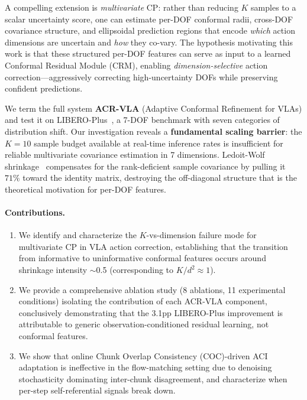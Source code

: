 \documentclass[letterpaper]{article}
\begin{document}
A compelling extension is \emph{multivariate} CP: rather than reducing $K$ samples to a scalar uncertainty score, one can estimate per-DOF conformal radii, cross-DOF covariance structure, and ellipsoidal prediction regions that encode \emph{which} action dimensions are uncertain and \emph{how} they co-vary.
The hypothesis motivating this work is that these structured per-DOF features can serve as input to a learned Conformal Residual Module (CRM), enabling \emph{dimension-selective} action correction---aggressively correcting high-uncertainty DOFs while preserving confident predictions.

We term the full system \textbf{ACR-VLA} (Adaptive Conformal Refinement for VLAs) and test it on LIBERO-Plus~\citep{srpo2025}, a 7-DOF benchmark with seven categories of distribution shift.
Our investigation reveals a \textbf{fundamental scaling barrier}: the $K{=}10$ sample budget available at real-time inference rates is insufficient for reliable multivariate covariance estimation in 7 dimensions.
Ledoit-Wolf shrinkage~\citep{ledoit2004well} compensates for the rank-deficient sample covariance by pulling it $71\%$ toward the identity matrix, destroying the off-diagonal structure that is the theoretical motivation for per-DOF features.

\paragraph{Contributions.}
\begin{enumerate}
    \item We identify and characterize the $K$-vs-dimension failure mode for multivariate CP in VLA action correction, establishing that the transition from informative to uninformative conformal features occurs around shrinkage intensity $\sim$0.5 (corresponding to $K/d^2 \approx 1$).
    \item We provide a comprehensive ablation study (8 ablations, 11 experimental conditions) isolating the contribution of each ACR-VLA component, conclusively demonstrating that the 3.1pp LIBERO-Plus improvement is attributable to generic observation-conditioned residual learning, not conformal features.
    \item We show that online Chunk Overlap Consistency (COC)-driven ACI adaptation is ineffective in the flow-matching setting due to denoising stochasticity dominating inter-chunk disagreement, and characterize when per-step self-referential signals break down.
\end{enumerate}
\end{document}
